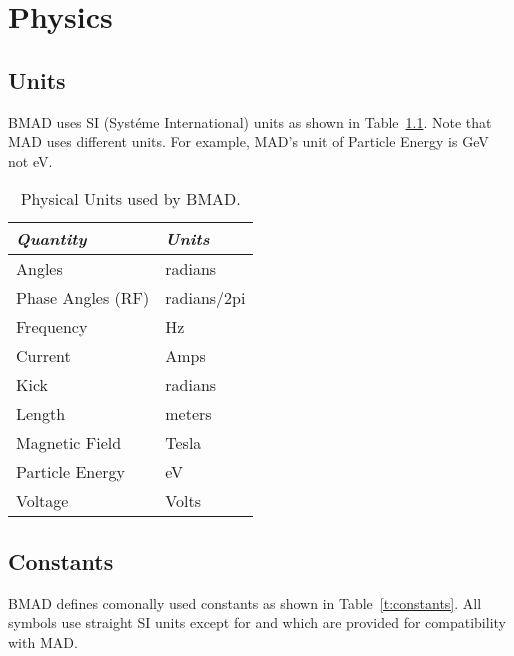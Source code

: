 \chapter{Physics}

\section{Units}

BMAD uses SI (Syst\'eme International) units as shown in
Table~\ref{t:units}.  Note that MAD uses different units. For example,
MAD's unit of Particle Energy is GeV not eV.

\begin{table}
\centering
\begin{tabular}{|l|l|} \hline
  {\em Quantity}     & {\em Units}     \\ \hline
  Angles             &    radians      \\ 
  Phase Angles (RF)  &    radians/2pi  \\ 
  Frequency          &    Hz           \\ 
  Current            &    Amps         \\ 
  Kick               &    radians      \\ 
  Length             &    meters       \\ 
  Magnetic Field     &    Tesla        \\ 
  Particle Energy    &    eV           \\ 
  Voltage            &    Volts        \\ \hline
\end{tabular}
\caption{Physical Units used by BMAD.}
\label{t:units}
\end{table}


\section{Constants}

BMAD defines comonally used constants as shown in Table~\ref{t:constants}.
All symbols use straight SI units except for  and  which are provided for compatibility with MAD.

